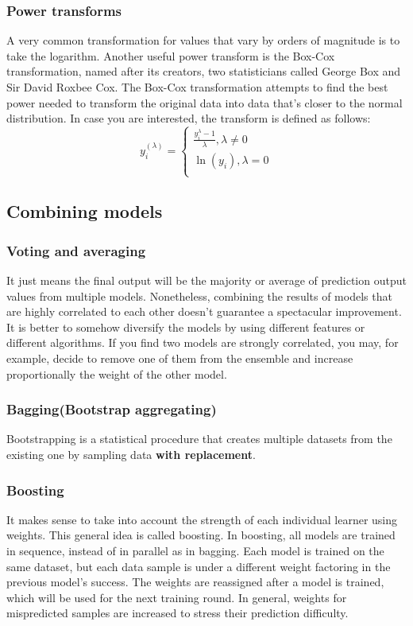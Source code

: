 \subsubsection*{Power transforms}
A very common transformation for values that vary by orders of magnitude is to take the logarithm. Another useful power transform is the Box-Cox transformation, named after its creators, two statisticians called George Box and Sir David Roxbee Cox. The Box-Cox transformation attempts to find the best power needed to transform the original data into data that's closer to the normal distribution. In case you are interested, the transform is defined as follows:
\begin{equation}
    y_i^{(\lambda)}=\left\{
    \begin{aligned}
        \frac{y_i^{\lambda}-1}{\lambda} , \lambda \neq 0 \\
        \ln(y_i)                        ,\lambda = 0     \\
    \end{aligned}
    \right.
\end{equation}
\subsection{Combining models}
\subsubsection*{Voting and averaging}
It just means the final output will be the majority or average of prediction output values from multiple models. Nonetheless, combining the results of models that are highly correlated to each other doesn't guarantee a spectacular improvement. It is better to somehow diversify the models by using different features or different algorithms. If you find two models are strongly correlated, you may, for example, decide to remove one of them from the ensemble and increase proportionally the weight of the other model.
\subsubsection*{Bagging(Bootstrap aggregating)}
Bootstrapping is a statistical procedure that creates multiple datasets from the existing one by sampling data \textbf{with replacement}.

\subsubsection*{Boosting}
It makes sense to take into account the strength of each individual learner using weights. This general idea is called boosting. In boosting, all models are trained in sequence, instead of in parallel as in bagging. Each model is trained on the same dataset, but each data sample is under a different weight factoring in the previous model's success. The weights are reassigned after a model is trained, which will be used for the next training round. In general, weights for mispredicted samples are increased to stress their prediction difficulty.

